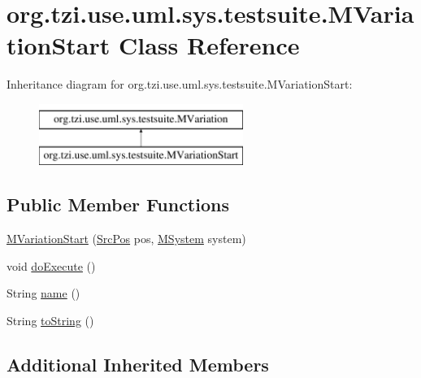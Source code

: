 \hypertarget{classorg_1_1tzi_1_1use_1_1uml_1_1sys_1_1testsuite_1_1_m_variation_start}{\section{org.\-tzi.\-use.\-uml.\-sys.\-testsuite.\-M\-Variation\-Start Class Reference}
\label{classorg_1_1tzi_1_1use_1_1uml_1_1sys_1_1testsuite_1_1_m_variation_start}
}
Inheritance diagram for org.\-tzi.\-use.\-uml.\-sys.\-testsuite.\-M\-Variation\-Start\-:\begin{figure}[H]
\begin{center}
\leavevmode
\includegraphics[height=2.000000cm]{classorg_1_1tzi_1_1use_1_1uml_1_1sys_1_1testsuite_1_1_m_variation_start}
\end{center}
\end{figure}
\subsection*{Public Member Functions}
\begin{DoxyCompactItemize}
\item 
\hyperlink{classorg_1_1tzi_1_1use_1_1uml_1_1sys_1_1testsuite_1_1_m_variation_start_a40f8851a9ca3ffb17d27f2ece452e23c}{M\-Variation\-Start} (\hyperlink{classorg_1_1tzi_1_1use_1_1parser_1_1_src_pos}{Src\-Pos} pos, \hyperlink{classorg_1_1tzi_1_1use_1_1uml_1_1sys_1_1_m_system}{M\-System} system)
\item 
void \hyperlink{classorg_1_1tzi_1_1use_1_1uml_1_1sys_1_1testsuite_1_1_m_variation_start_a47c455845365a26e9c4c4d7fae31af7a}{do\-Execute} ()
\item 
String \hyperlink{classorg_1_1tzi_1_1use_1_1uml_1_1sys_1_1testsuite_1_1_m_variation_start_ab3ae74ef477c3d910aa852028e432d57}{name} ()
\item 
String \hyperlink{classorg_1_1tzi_1_1use_1_1uml_1_1sys_1_1testsuite_1_1_m_variation_start_a7674602a13cc063b74d57655e5ca2a60}{to\-String} ()
\end{DoxyCompactItemize}
\subsection*{Additional Inherited Members}


